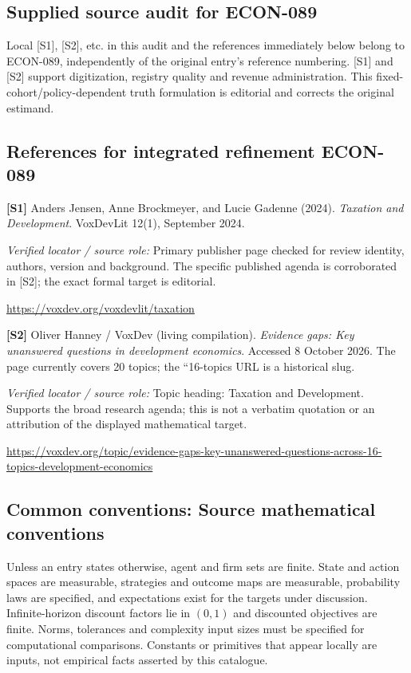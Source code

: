 \documentclass[11pt,a4paper]{article}
\begin{document}
\subsection*{Supplied source audit for ECON-089}
Local [S1], [S2], etc. in this audit and the references immediately below
belong to ECON-089, independently of the original entry's reference numbering.
[S1] and [S2] support digitization, registry quality and revenue administration. This fixed-cohort/policy-dependent truth formulation is editorial and corrects the original estimand.
\subsection*{References for integrated refinement ECON-089}
{\footnotesize\raggedright
\par\noindent\textbf{[S1]} Anders Jensen, Anne Brockmeyer, and Lucie Gadenne (2024). \emph{Taxation and Development}. VoxDevLit 12(1), September 2024.\par \textit{Verified locator / source role:} Primary publisher page checked for review identity, authors, version and background. The specific published agenda is corroborated in [S2]; the exact formal target is editorial.\par \url{https://voxdev.org/voxdevlit/taxation}\par\smallskip
\par\noindent\textbf{[S2]} Oliver Hanney / VoxDev (living compilation). \emph{Evidence gaps: Key unanswered questions in development economics}. Accessed 8 October 2026. The page currently covers 20 topics; the ``16-topics URL is a historical slug.\par \textit{Verified locator / source role:} Topic heading: Taxation and Development. Supports the broad research agenda; this is not a verbatim quotation or an attribution of the displayed mathematical target.\par \url{https://voxdev.org/topic/evidence-gaps-key-unanswered-questions-across-16-topics-development-economics}\par\smallskip
}

\subsection*{Common conventions: Source mathematical conventions}

Unless an entry states otherwise, agent and firm sets are finite. State and action spaces are measurable, strategies and outcome maps are measurable, probability laws are specified, and expectations exist for the targets under discussion. Infinite-horizon discount factors lie in $(0,1)$ and discounted objectives are finite. Norms, tolerances and complexity input sizes must be specified for computational comparisons. Constants or primitives that appear locally are inputs, not empirical facts asserted by this catalogue.
\end{document}

